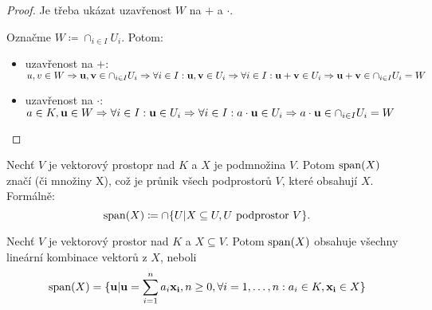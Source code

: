 \begin{proof}
    Je třeba ukázat uzavřenost $W$ na $+$ a $\cdot$. 
    
    Označme $W \coloneqq \cap_{i \in I} U_i$. Potom:
    \begin{itemize}
        \item uzavřenost na $+$: $u,v \in W \Rightarrow \mathbf{u},\mathbf{v} \in 
            \cap_{i \in I} U_i \Rightarrow \forall i \in I: \mathbf{u},\mathbf{v} \in U_i 
            \Rightarrow \forall i \in I: \mathbf{u}+\mathbf{v} \in U_i \Rightarrow \mathbf{u}+\mathbf{v} \in 
            \cap_{i \in I} U_i = W$
        \item uzavřenost na $\cdot$: $a \in K, \mathbf{u} \in W \Rightarrow \forall i
            \in I: \mathbf{u} \in U_i \Rightarrow \forall i \in I: a \cdot \mathbf{u} \in U_i
            \Rightarrow a \cdot \mathbf{u} \in \cap_{i \in I} U_i = W$
    \end{itemize}
\end{proof}

\begin{definition}
    Nechť $V$ je vektorový prostopr nad $K$ a $X$ je podmnožina $V$. Potom 
    $\mathop{\mathrm{span}}(X)$ značí  (či  množiny X), což je průnik všech podprostorů $V$, které obsahují $X$. 
    Formálně: $$\mathop{\mathrm{span}}(X) \coloneqq 
    \cap \{U | X \subseteq U, U \text{ podprostor } V\}.$$ 
\end{definition}

\begin{proposition}
    Nechť $V$ je vektorový prostor nad $K$ a $X \subseteq V$. Potom $\mathop{\mathrm{span}}(X)$
    obsahuje všechny lineární kombinace vektorů z $X$, neboli $$\mathop{\mathrm{span}}(X) = 
    \{\mathbf{u} | \mathbf{u} = \sum_{i=1}^{n}a_i \mathbf{x_i}, n \geq 0, 
    \forall i = 1, \dots, n: a_i \in K, \mathbf{x_i} \in X \}$$
\end{proposition}

